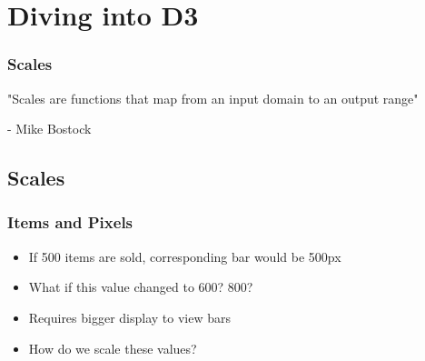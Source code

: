 \documentclass[red]{beamer}
\begin{document}


\begin{frame}
  \titlepage
\end{frame}

\section[Outline]{}

\section{Diving into D3}

\begin{frame}
    \frametitle{Scales}
    "Scales are functions that map from an input domain to an output range"

    \hspace{0.9cm} - Mike Bostock 
\end{frame}


\subsection{Scales}

\begin{frame}
  \frametitle{Items and Pixels}   %
  \lstl

  \begin{itemize}
  \item<1-> If 500 items are sold, corresponding bar would be 500px
  \item<2-> What if this value changed to 600? 800?
  \item<3-> Requires bigger display to view bars
  \item<4-> How do we scale these values?
  \end{itemize}
\end{frame}
\end{document}
